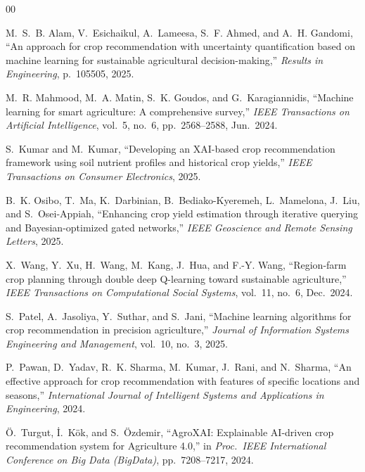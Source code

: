 \documentclass[conference]{IEEEtran}
\begin{document}

\begin{thebibliography}{00}

M.~S.~B. Alam, V.~Esichaikul, A.~Lameesa, S.~F. Ahmed, and A.~H. Gandomi,
``An approach for crop recommendation with uncertainty quantification based on
machine learning for sustainable agricultural decision-making,''
\textit{Results in Engineering}, p.~105505, 2025.

M.~R. Mahmood, M.~A. Matin, S.~K. Goudos, and G.~Karagiannidis,
``Machine learning for smart agriculture: A comprehensive survey,''
\textit{IEEE Transactions on Artificial Intelligence}, vol.~5, no.~6,
pp.~2568--2588, Jun.\ 2024.

S.~Kumar and M.~Kumar,
``Developing an XAI-based crop recommendation framework using soil nutrient
profiles and historical crop yields,''
\textit{IEEE Transactions on Consumer Electronics}, 2025.

B.~K. Osibo, T.~Ma, K.~Darbinian, B.~Bediako-Kyeremeh, L.~Mamelona,
J.~Liu, and S.~Osei-Appiah,
``Enhancing crop yield estimation through iterative querying and
Bayesian-optimized gated networks,''
\textit{IEEE Geoscience and Remote Sensing Letters}, 2025.

X.~Wang, Y.~Xu, H.~Wang, M.~Kang, J.~Hua, and F.-Y. Wang,
``Region-farm crop planning through double deep Q-learning toward sustainable
agriculture,''
\textit{IEEE Transactions on Computational Social Systems}, vol.~11, no.~6,
Dec.\ 2024.

S.~Patel, A.~Jasoliya, Y.~Suthar, and S.~Jani,
``Machine learning algorithms for crop recommendation in precision
agriculture,''
\textit{Journal of Information Systems Engineering and Management}, vol.~10,
no.~3, 2025.

P.~Pawan, D.~Yadav, R.~K. Sharma, M.~Kumar, J.~Rani, and N.~Sharma,
``An effective approach for crop recommendation with features of specific
locations and seasons,''
\textit{International Journal of Intelligent Systems and Applications in
Engineering}, 2024.

\"{O}.~Turgut, {\.{I}}.~K\"{o}k, and S.~\"{O}zdemir,
``AgroXAI: Explainable AI-driven crop recommendation system for Agriculture
4.0,''
in \textit{Proc.\ IEEE International Conference on Big Data (BigData)},
pp.~7208--7217, 2024.


\end{thebibliography}
\end{document}
